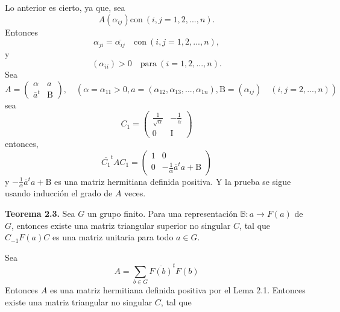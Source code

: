 \documentclass[12pt]{book}
\theoremstyle{definition}
\newcounter{in}
\newcounter{ini}
\begin{document}
Lo anterior es cierto, ya que, sea
\begin{equation*}
  A\left(\alpha_{ij}\right) \mathrm{con\ }
  \left(i,j=1,2,...,n\right).
\end{equation*}  
Entonces
\begin{equation*}
  \alpha_{ji}=\overline{\alpha_{ij}} \quad \mathrm{con\ }
  \left(i,j=1,2,...,n\right),
\end{equation*}
y
\begin{equation*}
\left(\alpha_{ii}\right)>0 \quad \mathrm{para\ }
\left(i=1,2,...,n\right).
\end{equation*}
Sea
\begin{equation*}
  A=
  \begin{pmatrix}
    \alpha & a \\ 
    \overline{a}^{t} & \mathrm{B}
  \end{pmatrix}, \quad \left(\alpha=\alpha_{11}>0,
    a=\left(\alpha_{12},\alpha_{13},...,\alpha_{1n}\right),
    \mathrm{B}=\left(\alpha_{ij}\right) \quad \left(i,j=2,...,n\right) \right)
\end{equation*}
sea
\begin{equation*} 
  C_{1}=
  \begin{pmatrix}
    \frac{1}{\sqrt{\alpha}} & -\frac{1}{\alpha} \\ 
    0 & \mathrm{I}
  \end{pmatrix}
\end{equation*}
entonces, 
\begin{equation*}
  \overline{C_{1}}^{t}AC_{1} =
  \begin{pmatrix}
    1 & 0 \\ 
    0 & -\frac{1}{\alpha}\overline{a}^{t}a+\mathrm{B}
  \end{pmatrix}
\end{equation*}  
y $-\frac{1}{\alpha}\overline{a}^{t}a+\mathrm{B}$ es una matriz
hermitiana definida positiva. Y la prueba se sigue usando inducción el
grado de $A$ veces.

\textbf{Teorema 2.3.} Sea $G$ un grupo finito. Para una representación
$\mathbb{B}: a\rightarrow F\left(a\right)$ de $G$, entonces existe una
matriz triangular superior no singular $C$, tal que
$C_{-1}F\left(a\right)C$ es una matriz unitaria para todo $a \in G$.

Sea
\begin{equation*}
A=\sum_{b \in G} \overline{F\left(b\right)}^{t}F\left(b\right)
\end{equation*}
Entonces $A$ es una matriz hermitiana definida positiva por el Lema
2.1. Entonces existe una matriz triangular no singular $C$, tal que
\end{document}

